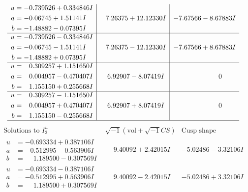 \documentclass[1p]{elsarticle_modified}
\theoremstyle{definition}
\newcommand{\I}{\sqrt{-1}}
\begin{document}
$$\begin{array}{c|c|c}
\begin{aligned}
u &= -0.739526 + 0.334846 I \\
a &= -0.06745 + 1.51141 I \\
b &= -1.48882 - 0.07395 I\end{aligned}
 & \phantom{-}7.26375 + 12.12330 I & -7.67566 - 8.67883 I \\ \hline\begin{aligned}
u &= -0.739526 - 0.334846 I \\
a &= -0.06745 - 1.51141 I \\
b &= -1.48882 + 0.07395 I\end{aligned}
 & \phantom{-}7.26375 - 12.12330 I & -7.67566 + 8.67883 I \\ \hline\begin{aligned}
u &= \phantom{-}0.309257 + 1.151650 I \\
a &= \phantom{-}0.004957 - 0.470407 I \\
b &= \phantom{-}1.155150 + 0.255668 I\end{aligned}
 & \phantom{-}6.92907 - 8.07419 I & \phantom{-0.000000 } 0 \\ \hline\begin{aligned}
u &= \phantom{-}0.309257 - 1.151650 I \\
a &= \phantom{-}0.004957 + 0.470407 I \\
b &= \phantom{-}1.155150 - 0.255668 I\end{aligned}
 & \phantom{-}6.92907 + 8.07419 I & \phantom{-0.000000 } 0\\
 \hline 
 \end{array}$$\newpage$$\begin{array}{c|c|c}  
\text{Solutions to }I^u_{2}& \I (\text{vol} + \sqrt{-1}CS) & \text{Cusp shape}\\
 \hline 
\begin{aligned}
u &= -0.693334 + 0.387106 I \\
a &= -0.512995 - 0.563906 I \\
b &= \phantom{-}1.189500 - 0.307569 I\end{aligned}
 & \phantom{-}9.40092 + 2.42015 I & -5.02486 - 3.32106 I \\ \hline\begin{aligned}
u &= -0.693334 - 0.387106 I \\
a &= -0.512995 + 0.563906 I \\
b &= \phantom{-}1.189500 + 0.307569 I\end{aligned}
 & \phantom{-}9.40092 - 2.42015 I & -5.02486 + 3.32106 I \\ \hline\begin{aligned}

\end{aligned}
\end{array}$$
\end{document}
